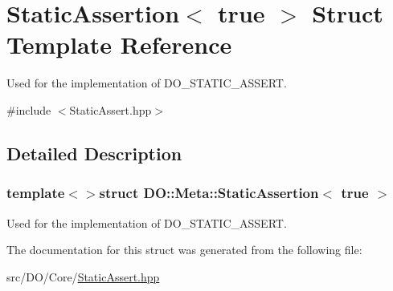 \hypertarget{struct_d_o_1_1_meta_1_1_static_assertion_3_01true_01_4}{\section{Static\-Assertion$<$ true $>$ Struct Template Reference}
\label{struct_d_o_1_1_meta_1_1_static_assertion_3_01true_01_4}
}


Used for the implementation of D\-O\-\_\-\-S\-T\-A\-T\-I\-C\-\_\-\-A\-S\-S\-E\-R\-T.  




{\ttfamily \#include $<$Static\-Assert.\-hpp$>$}



\subsection{Detailed Description}
\subsubsection*{template$<$$>$struct D\-O\-::\-Meta\-::\-Static\-Assertion$<$ true $>$}

Used for the implementation of D\-O\-\_\-\-S\-T\-A\-T\-I\-C\-\_\-\-A\-S\-S\-E\-R\-T. 

The documentation for this struct was generated from the following file\-:\begin{DoxyCompactItemize}
\item 
src/\-D\-O/\-Core/\hyperlink{_static_assert_8hpp}{Static\-Assert.\-hpp}\end{DoxyCompactItemize}
